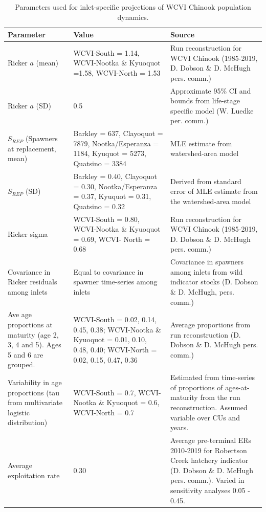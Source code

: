 \documentclass[11pt]{book}
\begin{document}
\renewcommand*{\arraystretch}{1.6}
\begin{longtable}[]{p{3.7cm} p{5cm} p{6.3cm}}
\caption{Parameters used for inlet-specific projections of WCVI Chinook population dynamics.}\\
\hline
Parameter & Value & Source \\ 
\hline
\endhead
Ricker $a$ (mean)  &  WCVI-South = 1.14, WCVI-Nootka \& Kyuoquot =1.58, WCVI-North = 1.53 & Run reconstruction for WCVI Chinook (1985-2019, D. Dobson \& D. McHugh pers. comm.)\\

Ricker $a$ (SD) & 0.5 &  Approximate 95\% CI and bounds from life-stage specific model (W. Luedke per. comm.)\\
$S_{REP}$ (Spawners at replacement, mean) & Barkley = 637, Clayoquot = 7879, Nootka/Esperanza = 1184, Kyuquot = 5273, Quatsino = 3384 & MLE estimate from watershed-area model \\

$S_{REP}$ (SD) & Barkley = 0.40, Clayoquot = 0.30, Nootka/Esperanza = 0.37, Kyuquot = 0.31, Quatsino = 0.32 & Derived from standard error of MLE estimate from the watershed-area model \\

Ricker sigma & WCVI-South = 0.80, WCVI-Nootka \& Kyuoquot = 0.69, WCVI- North = 0.68 & Run reconstruction for WCVI Chinook (1985-2019, D. Dobson \& D. McHugh pers. comm.)\\

Covariance in Ricker residuals among inlets & Equal to covariance in spawner time-series among inlets & Covariance in spawners among inlets from wild indicator stocks (D. Dobson \& D. McHugh, pers. comm.) \\ 

 Ave age proportions at maturity (age 2, 3, 4 and 5). Ages 5 and 6 are grouped. &  WCVI-South = 0.02, 0.14, 0.45, 0.38; WCVI-Nootka \& Kyuoquot = 0.01, 0.10, 0.48, 0.40; WCVI-North = 0.02, 0.15, 0.47, 0.36 & Average proportions from run reconstruction (D. Dobson \& D. McHugh pers. comm.) \\ 

 Variability in age proportions (tau from multivariate logistic distribution)  & WCVI-South = 0.7, WCVI-Nootka \& Kyuoquot = 0.6, WCVI-North = 0.7 & Estimated from time-series of proportions of ages-at-maturity from the run reconstruction. Assumed variable over CUs and years. \\

 Average exploitation rate & 0.30 & Average pre-terminal ERs 2010-2019 for Robertson Creek hatchery indicator (D. Dobson \& D. McHugh pers. comm.). Varied in sensitivity analyses 0.05 - 0.45.\\


\end{longtable}
\end{document}

